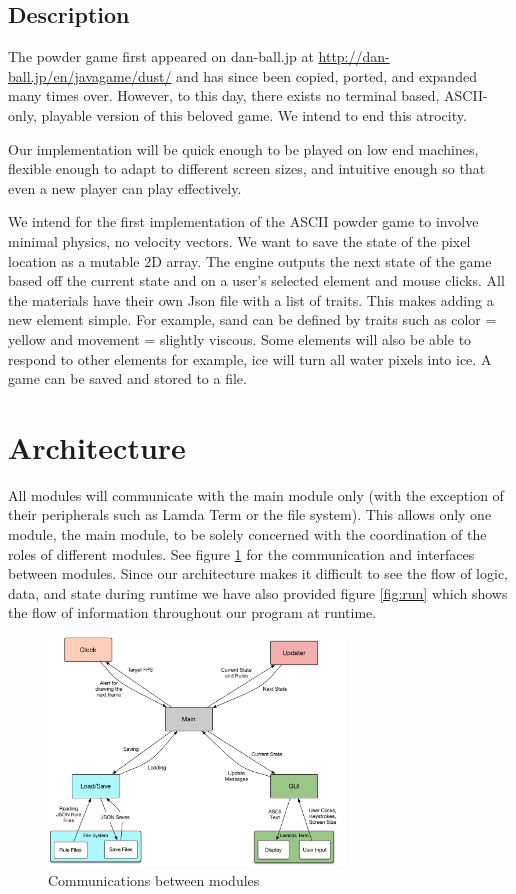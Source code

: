 \subsection{Description}
The powder game first appeared on dan-ball.jp at \url{http://dan-ball.jp/en/javagame/dust/} and has since been copied, ported, and expanded many times over. However, to this day, there exists no terminal based, ASCII-only, playable version of this beloved game. We intend to end this atrocity.

Our implementation will be quick enough to be played on low end machines, flexible enough to adapt to different screen sizes, and intuitive enough so that even a new player can play effectively. 

We intend for the first implementation of the ASCII powder game to involve minimal physics, no velocity vectors. We want to save the state of the pixel location as a mutable 2D array. The engine outputs the next state of the game based off the current state and on a user's selected element and mouse clicks. All the materials have their own Json file with a list of traits. This makes adding a new element simple. For example, sand can be defined by traits such as color = yellow and  movement = slightly viscous. Some elements will also be able to respond to other elements for example, ice will turn all water pixels into ice. A game can be saved and stored to a file.

\section{Architecture}
All modules will communicate with the main module only (with the exception of their
peripherals such as Lamda Term or the file system). This allows only one module, the
main module, to be solely concerned with the coordination of the roles of different
modules. See figure \ref{fig:com} for the communication and interfaces between modules.
Since our architecture makes it difficult to see the flow of logic, data, and state during
runtime we have also provided figure \ref{fig:run} which shows the flow of information
throughout our program at runtime.

\begin{figure}[H]
  \caption{Communications between modules}
  \label{fig:com}
  \vspace{3em}
  \center\includegraphics[width=0.7\textwidth]{images/communications}
\end{figure}


